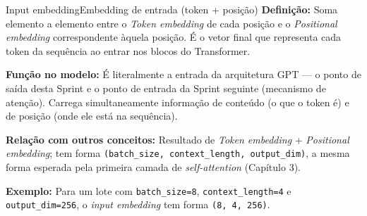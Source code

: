 \documentclass[11pt,a4paper]{article}
\newcommand{\campo}[2]{\textbf{\textcolor{accentblue}{#1:}} #2\par\smallskip}
\begin{document}
\begin{termo}{Input embedding}{Embedding de entrada (token + posição)}
\campo{Definição}{Soma elemento a elemento entre o \emph{Token embedding} de cada
posição e o \emph{Positional embedding} correspondente àquela posição. É o vetor
final que representa cada token da sequência ao entrar nos blocos do Transformer.}
\campo{Função no modelo}{É literalmente a entrada da arquitetura GPT --- o ponto de
saída desta Sprint e o ponto de entrada da Sprint seguinte (mecanismo de atenção).
Carrega simultaneamente informação de conteúdo (o que o token é) e de posição (onde ele
está na sequência).}
\campo{Relação com outros conceitos}{Resultado de \emph{Token embedding} +
\emph{Positional embedding}; tem forma
\texttt{(batch\_size, context\_length, output\_dim)}, a mesma forma esperada pela
primeira camada de \emph{self-attention} (Capítulo 3).}
\campo{Exemplo}{Para um lote com \texttt{batch\_size=8}, \texttt{context\_length=4} e
\texttt{output\_dim=256}, o \emph{input embedding} tem forma \texttt{(8, 4, 256)}.}
\end{termo}
\end{document}
